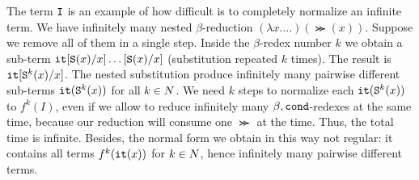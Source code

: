The term ${\tt I}$ is an example of how difficult is to completely normalize
an infinite term. We have infinitely many nested $\beta$-reduction $(\lambda x. 
\ldots)(\Succ (x))$. Suppose we remove all of them in a single step. Inside the $
\beta$-redex number $k$ we obtain a sub-term ${\tt it}[{\tt S} (x)/x]\ldots[{\tt S} (x)/x]
$ (substitution repeated $k$ times). The result is ${\tt it}[{\tt S} ^k(x)/x] $.
The nested substitution produce infinitely many pairwise different sub-terms 
${\tt it}({\tt S} ^k(x))$ for all $k \in {N}$. We need $k$ steps to normalize each $
{\tt it}({\tt S} ^k(x))$ to $f^k(I)$, even if we allow to reduce infinitely many $\beta,
{\tt cond}$-redexes at the same time, because our reduction will consume one $\Succ$ 
at the time. Thus, the total time is infinite. Besides, the normal form we obtain in 
this way not regular: it contains all terms $f^k({\tt it}(x))$ for $k \in {N}$, hence 
infinitely many pairwise different terms. 




